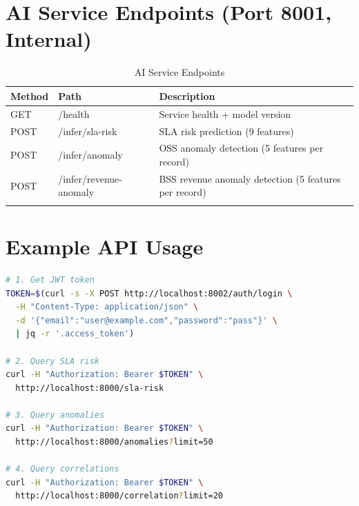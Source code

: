 \section{AI Service Endpoints (Port 8001, Internal)}

\begin{longtable}{@{}llp{6cm}@{}}
\toprule
\textbf{Method} & \textbf{Path} & \textbf{Description} \\
\midrule
\endhead
GET & /health & Service health + model version \\
POST & /infer/sla-risk & SLA risk prediction (9 features) \\
POST & /infer/anomaly & OSS anomaly detection (5 features per record) \\
POST & /infer/revenue-anomaly & BSS revenue anomaly detection (5 features per record) \\
\bottomrule
\caption{AI Service Endpoints}
\label{tab:ai-endpoints}
\end{longtable}

\section{Example API Usage}

\begin{lstlisting}[language=bash, caption={Authentication and data retrieval}]
# 1. Get JWT token
TOKEN=$(curl -s -X POST http://localhost:8002/auth/login \
  -H "Content-Type: application/json" \
  -d '{"email":"user@example.com","password":"pass"}' \
  | jq -r '.access_token')

# 2. Query SLA risk
curl -H "Authorization: Bearer $TOKEN" \
  http://localhost:8000/sla-risk

# 3. Query anomalies
curl -H "Authorization: Bearer $TOKEN" \
  http://localhost:8000/anomalies?limit=50

# 4. Query correlations
curl -H "Authorization: Bearer $TOKEN" \
  http://localhost:8000/correlation?limit=20
\end{lstlisting}
